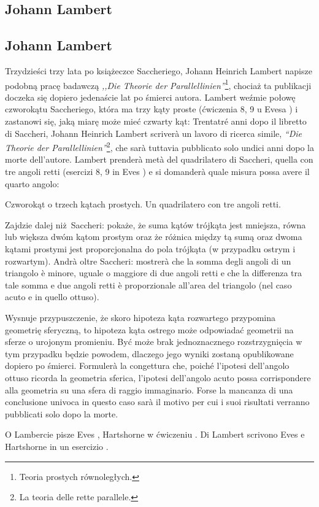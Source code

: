 %

\subsection{Johann Lambert} %
\subsection{Johann Lambert} %
\label{sekcja_lambert}

Trzydzieści trzy lata po książeczce Saccheriego, Johann Heinrich Lambert napisze podobną pracę badawczą \emph{,,Die Theorie der Parallellinien''}\footnote{Teoria prostych równoległych.}, chociaż ta publikacji doczeka się dopiero jedenaście lat po śmierci autora. %
Lambert weźmie połowę czworokątu Saccheriego, która ma trzy kąty proste (ćwiczenia 8, 9 u Evesa \cite[s. 289]{eves1_1972}) i zastanowi się, jaką miarę może mieć czwarty kąt: %
Trentatré anni dopo il libretto di Saccheri, Johann Heinrich Lambert scriverà un lavoro di ricerca simile, \emph{``Die Theorie der Parallellinien''}\footnote{La teoria delle rette parallele.}, che sarà tuttavia pubblicato solo undici anni dopo la morte dell'autore. %
Lambert prenderà metà del quadrilatero di Saccheri, quella con tre angoli retti (esercizi 8, 9 in Eves \cite[p. 289]{eves1_1972}) e si domanderà quale misura possa avere il quarto angolo: %

\begin{definition}
[czworokąt Lamberta] %
[quadrilatero di Lambert] %
	Czworokąt o trzech kątach prostych. %
	Un quadrilatero con tre angoli retti. %
\end{definition}

Zajdzie dalej niż Saccheri: pokaże, że suma kątów trójkąta jest mniejsza, równa lub większa dwóm kątom prostym oraz że różnica między tą sumą oraz dwoma kątami prostymi jest proporcjonalna do pola trójkąta (w przypadku ostrym i rozwartym). %
Andrà oltre Saccheri: mostrerà che la somma degli angoli di un triangolo è minore, uguale o maggiore di due angoli retti e che la differenza tra tale somma e due angoli retti è proporzionale all'area del triangolo (nel caso acuto e in quello ottuso). %

Wysnuje przypuszczenie, że skoro hipoteza kąta rozwartego przypomina geometrię sferyczną, to hipoteza kąta ostrego może odpowiadać geometrii na sferze o urojonym promieniu. %
Być może brak jednoznacznego rozstrzygnięcia w tym przypadku będzie powodem, dlaczego jego wyniki zostaną opublikowane dopiero po śmierci. %
Formulerà la congettura che, poiché l'ipotesi dell'angolo ottuso ricorda la geometria sferica, l'ipotesi dell'angolo acuto possa corrispondere alla geometria su una sfera di raggio immaginario. %
Forse la mancanza di una conclusione univoca in questo caso sarà il motivo per cui i suoi risultati verranno pubblicati solo dopo la morte. %

O Lambercie pisze Eves \cite[s. 285, 286]{eves1_1972}, Hartshorne w ćwiczeniu \cite[s. 316]{hartshorne_2000}. %
Di Lambert scrivono Eves \cite[p. 285, 286]{eves1_1972} e Hartshorne in un esercizio \cite[p. 316]{hartshorne_2000}. %

%